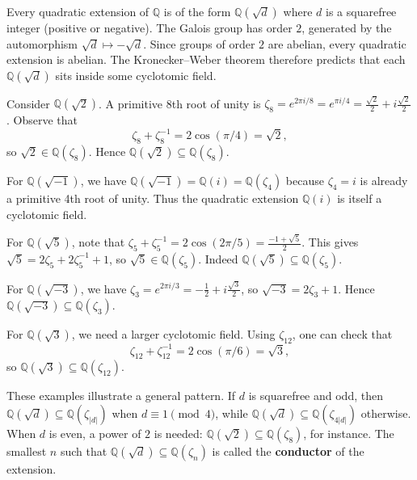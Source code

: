 Every quadratic extension of $\mathbb{Q}$ is of the form $\mathbb{Q}(\sqrt{d})$ where $d$ is a squarefree integer (positive or negative). The Galois group has order $2$, generated by the automorphism $\sqrt{d} \mapsto -\sqrt{d}$. Since groups of order $2$ are abelian, every quadratic extension is abelian. The Kronecker--Weber theorem therefore predicts that each $\mathbb{Q}(\sqrt{d})$ sits inside some cyclotomic field.

\begin{example}
Consider $\mathbb{Q}(\sqrt{2})$. A primitive 8th root of unity is $\zeta_8 = e^{2\pi i/8} = e^{\pi i/4} = \frac{\sqrt{2}}{2} + i\frac{\sqrt{2}}{2}$. Observe that
\[
\zeta_8 + \zeta_8^{-1} = 2\cos(\pi/4) = \sqrt{2},
\]
so $\sqrt{2} \in \mathbb{Q}(\zeta_8)$. Hence $\mathbb{Q}(\sqrt{2}) \subseteq \mathbb{Q}(\zeta_8)$.
\end{example}

\begin{example}
For $\mathbb{Q}(\sqrt{-1})$, we have $\mathbb{Q}(\sqrt{-1}) = \mathbb{Q}(i) = \mathbb{Q}(\zeta_4)$ because $\zeta_4 = i$ is already a primitive 4th root of unity. Thus the quadratic extension $\mathbb{Q}(i)$ is itself a cyclotomic field.
\end{example}

\begin{example}
For $\mathbb{Q}(\sqrt{5})$, note that $\zeta_5 + \zeta_5^{-1} = 2\cos(2\pi/5) = \frac{-1 + \sqrt{5}}{2}$. This gives $\sqrt{5} = 2\zeta_5 + 2\zeta_5^{-1} + 1$, so $\sqrt{5} \in \mathbb{Q}(\zeta_5)$. Indeed $\mathbb{Q}(\sqrt{5}) \subseteq \mathbb{Q}(\zeta_5)$.
\end{example}

\begin{example}
For $\mathbb{Q}(\sqrt{-3})$, we have $\zeta_3 = e^{2\pi i/3} = -\frac12 + i\frac{\sqrt{3}}{2}$, so $\sqrt{-3} = 2\zeta_3 + 1$. Hence $\mathbb{Q}(\sqrt{-3}) \subseteq \mathbb{Q}(\zeta_3)$.
\end{example}

\begin{example}
For $\mathbb{Q}(\sqrt{3})$, we need a larger cyclotomic field. Using $\zeta_{12}$, one can check that
\[
\zeta_{12} + \zeta_{12}^{-1} = 2\cos(\pi/6) = \sqrt{3},
\]
so $\mathbb{Q}(\sqrt{3}) \subseteq \mathbb{Q}(\zeta_{12})$.
\end{example}

These examples illustrate a general pattern. If $d$ is squarefree and odd, then $\mathbb{Q}(\sqrt{d}) \subseteq \mathbb{Q}(\zeta_{|d|})$ when $d \equiv 1 \pmod{4}$, while $\mathbb{Q}(\sqrt{d}) \subseteq \mathbb{Q}(\zeta_{4|d|})$ otherwise. When $d$ is even, a power of $2$ is needed: $\mathbb{Q}(\sqrt{2}) \subseteq \mathbb{Q}(\zeta_8)$, for instance. The smallest $n$ such that $\mathbb{Q}(\sqrt{d}) \subseteq \mathbb{Q}(\zeta_n)$ is called the \textbf{conductor} of the extension.

